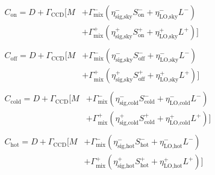 \begin{gather}
    \begin{split}
        C_\text{on}
        =
        D
        +
        \Gamma_\text{CCD}
        \Big[
            M
            &+
            \Gamma^-_\text{mix}
            \left(
                \eta^-_\text{sig,sky} S^-_\text{on}
                +
                \eta^-_\text{LO,sky} L^-
            \right)
        \\
            &+
            \Gamma^+_\text{mix}
            \left(
                \eta^+_\text{sig,sky} S^+_\text{on}
                +
                \eta^+_\text{LO,sky} L^+
            \right)
        \Big] \label{eq:Con}
    \end{split}
    \\
    \begin{split}
        C_\text{off}
        =
        D
        +
        \Gamma_\text{CCD}
        \Big[
            M
            &+
            \Gamma^-_\text{mix}
            \left(
                \eta^-_\text{sig,sky} S^-_\text{off}
                +
                \eta^-_\text{LO,sky} L^-
            \right)
        \\
            &+
            \Gamma^+_\text{mix}
            \left(
                \eta^+_\text{sig,sky} S^+_\text{off}
                +
                \eta^+_\text{LO,sky} L^+
            \right)
        \Big]
        \label{eq:Coff}
    \end{split}
    \\
    \begin{split}
        C_\text{cold}
        =
        D
        +
        \Gamma_\text{CCD}
        \Big[
            M
            &+
            \Gamma^-_\text{mix}
            \left(
                \eta^-_\text{sig,cold} S^-_\text{cold}
                +
                \eta^-_\text{LO,cold} L^-
            \right)
        \\
            &+
            \Gamma^+_\text{mix}
            \left(
                \eta^+_\text{sig,cold} S^+_\text{cold}
                +
                \eta^+_\text{LO,cold} L^+
            \right)
        \Big]
        \label{eq:Ccold}
    \end{split}
    \\
    \begin{split}
        C_\text{hot}
        =
        D
        +
        \Gamma_\text{CCD}
        \Big[
            M
            &+
            \Gamma^-_\text{mix}
            \left(
                \eta^-_\text{sig,hot} S^-_\text{hot}
                +
                \eta^-_\text{LO,hot} L^-
            \right)
        \\
            &+
            \Gamma^+_\text{mix}
            \left(
                \eta^+_\text{sig,hot} S^+_\text{hot}
                +
                \eta^+_\text{LO,hot} L^+
            \right)
        \Big]
        \label{eq:Chot}
    \end{split}
\end{gather}
